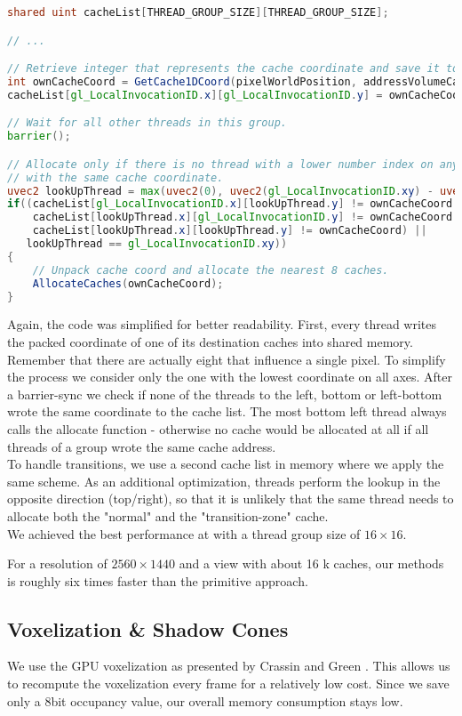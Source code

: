\documentclass[thesis.tex]{subfiles}
\begin{document}
\begin{lstlisting}[language=GLSL]
shared uint cacheList[THREAD_GROUP_SIZE][THREAD_GROUP_SIZE];

// ...

// Retrieve integer that represents the cache coordinate and save it to the shared memory.
int ownCacheCoord = GetCache1DCoord(pixelWorldPosition, addressVolumeCascade);
cacheList[gl_LocalInvocationID.x][gl_LocalInvocationID.y] = ownCacheCoord;

// Wait for all other threads in this group.
barrier();

// Allocate only if there is no thread with a lower number index on any axis
// with the same cache coordinate.
uvec2 lookUpThread = max(uvec2(0), uvec2(gl_LocalInvocationID.xy) - uvec2(1));
if((cacheList[gl_LocalInvocationID.x][lookUpThread.y] != ownCacheCoord && 
    cacheList[lookUpThread.x][gl_LocalInvocationID.y] != ownCacheCoord &&
    cacheList[lookUpThread.x][lookUpThread.y] != ownCacheCoord) ||
   lookUpThread == gl_LocalInvocationID.xy))
{
	// Unpack cache coord and allocate the nearest 8 caches.
	AllocateCaches(ownCacheCoord);
}
\end{lstlisting}
Again, the code was simplified for better readability.
First, every thread writes the packed coordinate of one of its destination caches into shared memory.
Remember that there are actually eight that influence a single pixel.
To simplify the process we consider only the one with the lowest coordinate on all axes.
After a barrier-sync we check if none of the threads to the left, bottom or left-bottom wrote the same coordinate to the cache list.
The most bottom left thread always calls the allocate function - otherwise no cache would be allocated at all if all threads of a group wrote the same cache address.
\\
To handle transitions, we use a second cache list in memory where we apply the same scheme.
As an additional optimization, threads perform the lookup in the opposite direction (top/right), so that it is unlikely that the same thread needs to allocate both the "normal" and the "transition-zone" cache.
\\
We achieved the best performance at with a thread group size of $16\times16$.

For a resolution of $2560\times1440$ and a view with about 16 k caches, our methods is roughly six times faster than the primitive approach.

\subsection{Voxelization \& Shadow Cones}
We use the GPU voxelization as presented by Crassin and Green \cite{bib:openglinsightsvoxel}.
This allows us to recompute the voxelization every frame for a relatively low cost.
Since we save only a 8bit occupancy value, our overall memory consumption stays low.
\end{document}
